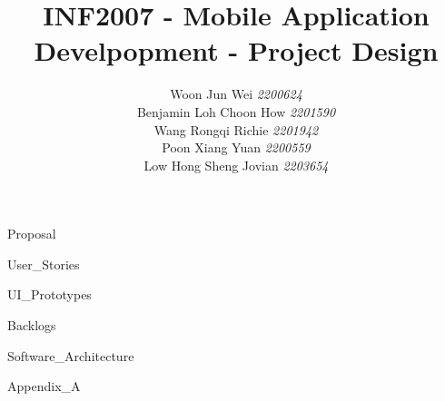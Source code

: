 \documentclass[a4paper, 11pt, notitlepage]{report}
\author{
        Woon Jun Wei \textit{2200624} \\
        Benjamin Loh Choon How \textit{2201590} \\
        Wang Rongqi Richie \textit{2201942} \\
        Poon Xiang Yuan \textit{2200559} \\
        Low Hong Sheng Jovian \textit{2203654}\\
    }
\title{
  INF2007 - Mobile Application Develpopment - Project Design 
}
\begin{document}
\maketitle


{Proposal}


{User_Stories}


{UI_Prototypes}


{Backlogs}


{Software_Architecture}

\appendix
{Appendix_A}



\newpage


\end{document}
